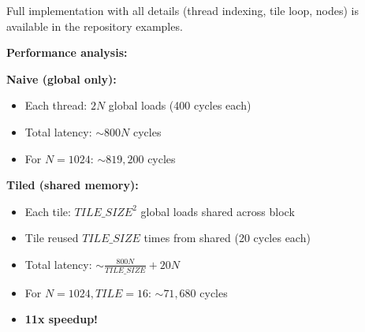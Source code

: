 Full implementation with all details (thread indexing, tile loop,  nodes) is available in the repository examples.

\textbf{Performance analysis:}

\textbf{Naive (global only):}
\begin{itemize}[noitemsep]
  \item Each thread: $2N$ global loads (400 cycles each)
  \item Total latency: $\sim 800N$ cycles
  \item For $N=1024$: $\sim 819,200$ cycles
\end{itemize}

\textbf{Tiled (shared memory):}
\begin{itemize}[noitemsep]
  \item Each tile: $TILE\_SIZE^2$ global loads shared across block
  \item Tile reused $TILE\_SIZE$ times from shared (20 cycles each)
  \item Total latency: $\sim \frac{800N}{TILE\_SIZE} + 20N$
  \item For $N=1024, TILE=16$: $\sim 71,680$ cycles
  \item \textbf{11x speedup!}
\end{itemize}

